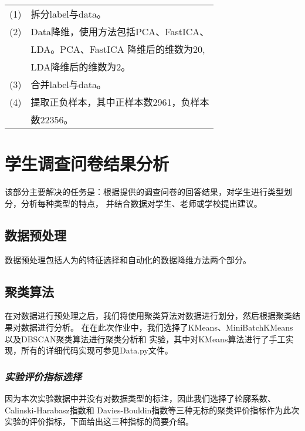 \documentclass{acm_proc_article-sp}
\begin{document}
\begin{supertabular}{ll}
       (1)&	拆分label与data。\\
       (2)&	Data降维，使用方法包括PCA、FastICA、\\
       & LDA。PCA、FastICA 降维后的维数为20, \\
       &LDA降维后的维数为2。\\
       (3)&	合并label与data。\\
       (4)&	提取正负样本，其中正样本数2961，负样本\\
       &数22356。\\
\end{supertabular}

\section{\textsf{学生调查问卷结果分析}}

该部分主要解决的任务是：根据提供的调查问卷的回答结果，对学生进行类型划分，分析每种类型的特点，
并结合数据对学生、老师或学校提出建议。

\subsection{\textsf{数据预处理}}

数据预处理包括人为的特征选择和自动化的数据降维方法两个部分。


\subsection{\textsf{聚类算法}}

在对数据进行预处理之后，我们将使用聚类算法对数据进行划分，然后根据聚类结果对数据进行分析。
在在此次作业中，我们选择了KMeans、MiniBatchKMeans以及DBSCAN聚类算法进行聚类分析和
实验，其中对KMeans算法进行了手工实现，所有的详细代码实现可参见Data.py文件。

\subsubsection{\textit{实验评价指标选择}}

因为本次实验数据中并没有对数据类型的标注，因此我们选择了轮廓系数、Calinski-Harabasz指数和
Davies-Bouldin指数等三种无标的聚类评价指标作为此次实验的评价指标，下面给出这三种指标的简要介绍。
\end{document}
